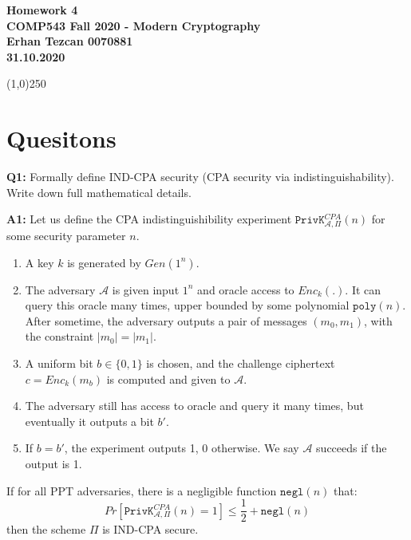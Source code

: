 \documentclass[12pt,reqno]{amsart}
\newcommand{\code}[1]{\texttt{#1}}
\newcommand{\advrs}[0]{\mathcal{A}}
\begin{document}
\begin{center}
\large\textbf{Homework 4 \\ COMP543 Fall 2020 - Modern Cryptography \\}
\normalsize\textbf{ Erhan Tezcan 0070881 \\ 31.10.2020} \\
\end{center}

\begin{center}
\line(1,0){250}
\end{center}

%
%

\section{Quesitons}
\textbf{Q1:} Formally define IND-CPA security (CPA security via indistinguishability). Write down full mathematical details.

\textbf{A1:} Let us define the CPA indistinguishibility experiment $\code{PrivK}_{\advrs,\Pi}^{CPA}(n)$ for some security parameter $n$.
\begin{enumerate}
	\item A key $k$ is generated by $Gen(1^n)$.
	\item The adversary $\advrs$ is given input $1^n$ and oracle access to $Enc_k(.)$. It can query this oracle many times, upper bounded by some polynomial $\code{poly}(n)$. After sometime, the adversary outputs a pair of messages $(m_0,m_1)$, with the constraint $|m_0|=|m_1|$.
	\item A uniform bit $b \in \{0, 1\}$ is chosen, and the challenge ciphertext $c=Enc_k(m_b)$ is computed and given to $\advrs$.
	\item The adversary still has access to oracle and query it many times, but eventually it outputs a bit $b'$.
	\item If $b=b'$, the experiment outputs 1, 0 otherwise. We say $\advrs$ succeeds if the output is 1.
\end{enumerate}
If for all PPT adversaries, there is a negligible function $\code{negl}(n)$ that:
$$
Pr[\code{PrivK}_{\advrs,\Pi}^{CPA}(n)=1] \leq \frac{1}{2} + \code{negl}(n)
$$
then the scheme $\Pi$ is IND-CPA secure.
\end{document}
